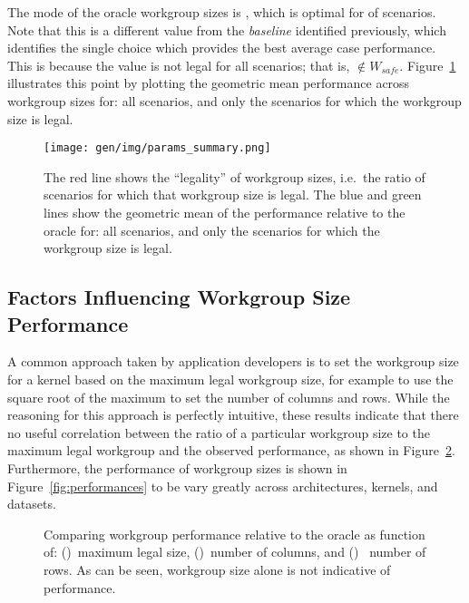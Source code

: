 The mode of the oracle workgroup sizes is
, which is optimal for
 of scenarios. Note that this is
a different value from the \emph{baseline} identified previously,
which identifies the single choice which provides the best average
case performance. This is because the value is not legal for all
scenarios; that is, $ \not\in W_{safe}$.
Figure~\ref{fig:performance-legality} illustrates this point by
plotting the geometric mean performance across workgroup sizes for:
all scenarios, and only the scenarios for which the workgroup size is
legal.

\begin{figure}
\centering
\texttt{[image: gen/img/params\_summary.png]}
\caption{%
  The red line shows the ``legality'' of workgroup sizes, i.e.\ the
  ratio of scenarios for which that workgroup size is legal.  The blue
  and green lines show the geometric mean of the performance relative
  to the oracle for: all scenarios, and only the scenarios for which
  the workgroup size is legal.%
}
\label{fig:performance-legality}
\end{figure}


\subsection{Factors Influencing Workgroup Size Performance}

A common approach taken by application developers is to set the
workgroup size for a kernel based on the maximum legal workgroup size,
for example to use the square root of the maximum to set the number of
columns and rows. While the reasoning for this approach is perfectly
intuitive, these results indicate that there no useful correlation
between the ratio of a particular workgroup size to the maximum legal
workgroup and the observed performance, as shown in
Figure~\ref{fig:performance-wgsizes}. Furthermore, the performance of
workgroup sizes is shown in Figure~\ref{fig:performances} to be vary
greatly across architectures, kernels, and datasets.


\begin{figure}

\caption{%
  Comparing workgroup performance relative to the oracle as function
  of: ()~maximum legal size,
  ()~number of columns, and
  ()~ number of rows. As can be seen,
  workgroup size alone is not indicative of performance. %
}
\label{fig:performance-wgsizes}
\end{figure}

